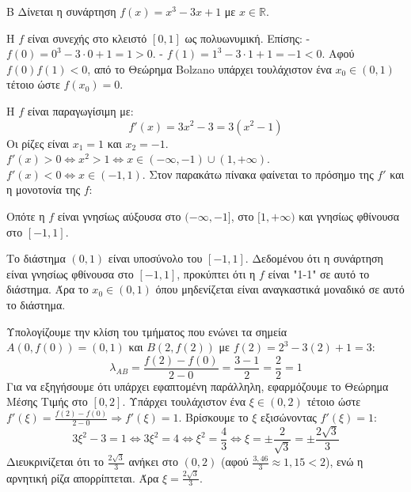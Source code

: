 \begin{thema}{Β}
Δίνεται η συνάρτηση $f(x) = x^3 - 3x + 1$ με $x \in \mathbb{R}$.
\begin{erwthma}
\item Η $f$ είναι συνεχής στο κλειστό $[0, 1]$ ως πολυωνυμική.
Επίσης:
- $f(0) = 0^3 - 3 \cdot 0 + 1 = 1 > 0$.
- $f(1) = 1^3 - 3 \cdot 1 + 1 = -1 < 0$.
Αφού $f(0)f(1) < 0$, από το Θεώρημα Bolzano υπάρχει τουλάχιστον ένα $x_0 \in (0, 1)$ τέτοιο ώστε $f(x_0)=0$.

\item Η $f$ είναι παραγωγίσιμη με:
\[ f'(x) = 3x^2 - 3 = 3(x^2 - 1) \]
Οι ρίζες είναι $x_1=1$ και $x_2=-1$.
$f'(x) > 0 \Leftrightarrow x^2 > 1 \Leftrightarrow x \in (-\infty, -1) \cup (1, +\infty)$.
$f'(x) < 0 \Leftrightarrow x \in (-1, 1)$.
Στον παρακάτω πίνακα φαίνεται το πρόσημο της $f'$ και η μονοτονία της $f$:
\begin{center}
\end{center}
Οπότε η $f$ είναι γνησίως αύξουσα στο $(-\infty, -1]$, στο $[1, +\infty)$ και γνησίως φθίνουσα στο $[-1, 1]$.

\item Το διάστημα $(0, 1)$ είναι υποσύνολο του $[-1, 1]$. Δεδομένου ότι η συνάρτηση είναι γνησίως φθίνουσα στο $[-1, 1]$, προκύπτει ότι η $f$ είναι "1-1" σε αυτό το διάστημα. Άρα το $x_0 \in (0, 1)$ όπου μηδενίζεται είναι αναγκαστικά μοναδικό σε αυτό το διάστημα.

\item Υπολογίζουμε την κλίση του τμήματος που ενώνει τα σημεία $A(0, f(0)) = (0, 1)$ και $B(2, f(2))$ με $f(2) = 2^3 - 3(2) + 1 = 3$:
\[ \lambda_{AB} = \frac{f(2) - f(0)}{2 - 0} = \frac{3 - 1}{2} = \frac{2}{2} = 1 \]
Για να εξηγήσουμε ότι υπάρχει εφαπτομένη παράλληλη, εφαρμόζουμε το Θεώρημα Μέσης Τιμής στο $[0, 2]$. Υπάρχει τουλάχιστον ένα $\xi \in (0, 2)$ τέτοιο ώστε $f'(\xi) = \frac{f(2)-f(0)}{2-0} \Rightarrow f'(\xi)=1$.
Βρίσκουμε το $\xi$ εξισώνοντας $f'(\xi) = 1$:
\[ 3\xi^2 - 3 = 1 \Leftrightarrow 3\xi^2 = 4 \Leftrightarrow \xi^2 = \frac{4}{3} \Leftrightarrow \xi = \pm \frac{2}{\sqrt{3}} = \pm \frac{2\sqrt{3}}{3} \]
Διευκρινίζεται ότι το $\frac{2\sqrt{3}}{3}$ ανήκει στο $(0, 2)$ (αφού $\frac{3,46}{3} \approx 1,15 < 2$), ενώ η αρνητική ρίζα απορρίπτεται. Άρα $\xi = \frac{2\sqrt{3}}{3}$.
\end{erwthma}
\end{thema}

